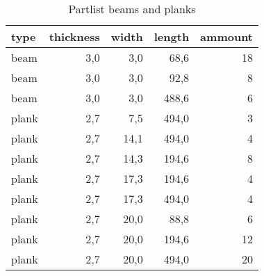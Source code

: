 \begin{table}[h!]
\centering
\caption{Partlist beams and planks}
\begin{tabular}{lrrrr}
\toprule
 type &  thickness &  width &  length &  ammount \\
\midrule
 beam &        3,0 &    3,0 &    68,6 &       18 \\
 beam &        3,0 &    3,0 &    92,8 &        8 \\
 beam &        3,0 &    3,0 &   488,6 &        6 \\
plank &        2,7 &    7,5 &   494,0 &        3 \\
plank &        2,7 &   14,1 &   494,0 &        4 \\
plank &        2,7 &   14,3 &   194,6 &        8 \\
plank &        2,7 &   17,3 &   194,6 &        4 \\
plank &        2,7 &   17,3 &   494,0 &        4 \\
plank &        2,7 &   20,0 &    88,8 &        6 \\
plank &        2,7 &   20,0 &   194,6 &       12 \\
plank &        2,7 &   20,0 &   494,0 &       20 \\
\bottomrule
\end{tabular}
\end{table}
